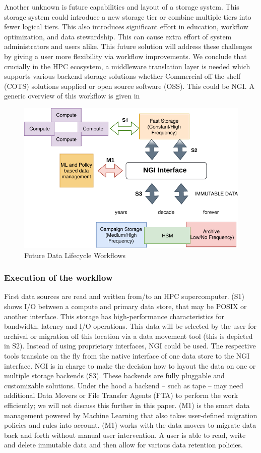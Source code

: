 \documentclass[a4paper, twocolumn]{article}
\begin{document}
Another unknown is future capabilities and layout of a storage system.
This storage system could introduce a new storage tier or combine multiple tiers into fewer logical tiers.
This also introduces significant effort in education, workflow optimization, and data stewardship.
This can cause extra effort of system administrators and users alike.
This future solution will address these challenges by giving a user more flexibility via workflow improvements.
We conclude that crucially in the HPC ecosystem, a middleware translation layer is needed which supports various backend storage solutions whether Commercial-off-the-shelf (COTS) solutions supplied or open source software (OSS).
This could be NGI.
A generic overview of this workflow is given in 

\begin{figure}[b]
  \includegraphics[width=0.75\columnwidth]{datalifecycle-workflow}
  \caption{Future Data Lifecycle Workflows}
  \label{fig:dataLifecycle}
\end{figure}

\subsubsection{Execution of the workflow}

First data sources are read and written from/to an HPC supercomputer.
(S1) shows I/O between a compute and primary data store, that may be POSIX or another interface.
This storage has high-performance characteristics for bandwidth, latency and I/O operations.
This data will be selected by the user for archival or migration off this location via a data movement tool (this is depicted in S2).
Instead of using proprietary interfaces, NGI could be used.
The respective tools translate on the fly from the native interface of one data store to the NGI interface.
NGI is in charge to make the decision how to layout the data on one or multiple storage backends (S3).
These backends are fully pluggable and customizable solutions.
Under the hood a backend -- such as tape -- may need additional Data Movers or File Transfer Agents (FTA) to perform the work efficiently; we will not discuss this further in this paper.
(M1) is the smart data management powered by Machine Learning that also takes user-defined migration policies and rules into account.
(M1) works with the data movers to migrate data back and forth without manual user intervention.
A user is able to read, write and delete immutable data and then allow for various data retention policies.
\end{document}
